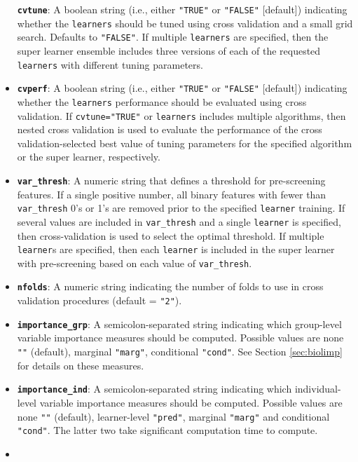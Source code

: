 \documentclass[]{article}
\begin{document}
\begin{itemize}
  \textbf{\texttt{cvtune}}: A boolean string (i.e., either
  \texttt{"TRUE"} or \texttt{"FALSE"} {[}default{]}) indicating whether
  the \texttt{learners} should be tuned using cross validation and a
  small grid search. Defaults to \texttt{"FALSE"}. If multiple
  \texttt{learners} are specified, then the super learner ensemble
  includes three versions of each of the requested \texttt{learners}
  with different tuning parameters.
\item
  \textbf{\texttt{cvperf}}: A boolean string (i.e., either
  \texttt{"TRUE"} or \texttt{"FALSE"} {[}default{]}) indicating whether
  the \texttt{learners} performance should be evaluated using cross
  validation. If \texttt{cvtune="TRUE"} or \texttt{learners} includes
  multiple algorithms, then nested cross validation is used to evaluate
  the performance of the cross validation-selected best value of tuning
  parameters for the specified algorithm or the super learner,
  respectively.
\item
  \textbf{\texttt{var\_thresh}}: A numeric string that defines a
  threshold for pre-screening features. If a single positive number, all
  binary features with fewer than \texttt{var\_thresh} 0's or 1's are
  removed prior to the specified \texttt{learner} training. If several
  values are included in \texttt{var\_thresh} and a single
  \texttt{learner} is specified, then cross-validation is used to select
  the optimal threshold. If multiple \texttt{learner}s are specified,
  then each \texttt{learner} is included in the super learner with
  pre-screening based on each value of \texttt{var\_thresh}.
\item
  \textbf{\texttt{nfolds}}: A numeric string indicating the number of
  folds to use in cross validation procedures (default = \texttt{"2"}).
\item
  \textbf{\texttt{importance\_grp}}: A semicolon-separated string
  indicating which group-level variable importance measures should be
  computed. Possible values are none \texttt{""} (default), marginal
  \texttt{"marg"}, conditional \texttt{"cond"}. See Section
  \ref{sec:biolimp} for details on these measures.
\item
  \textbf{\texttt{importance\_ind}}: A semicolon-separated string
  indicating which individual-level variable importance measures should
  be computed. Possible values are none \texttt{""} (default),
  learner-level \texttt{"pred"}, marginal \texttt{"marg"} and
  conditional \texttt{"cond"}. The latter two take significant
  computation time to compute.
\item

\end{itemize}
\end{document}
